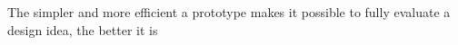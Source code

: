 \begin{principle} \label{prin:economic_principle_of_prototyping} 
  The simpler and more efficient a prototype makes it possible to fully evaluate a design idea, the better it is \cite[p. 7:4]{lim}
\end{principle}